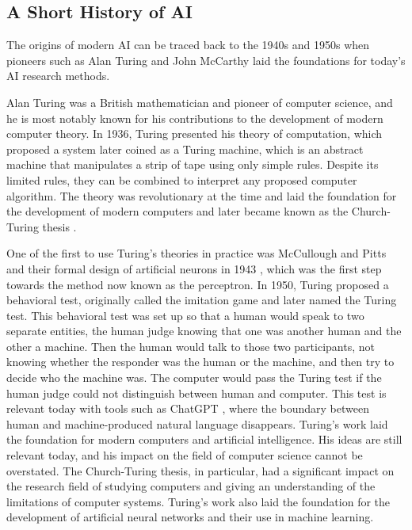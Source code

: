 \subsection{A Short History of AI}
The origins of modern AI can be traced back to the 1940s and 1950s when pioneers such as Alan Turing and John McCarthy laid the foundations for today's AI research methods. 

Alan Turing was a British mathematician and pioneer of computer science, and he is most notably known for his contributions to the development of modern computer theory. In 1936, Turing presented his theory of computation, which proposed a system later coined as a Turing machine, which is an abstract machine that manipulates a strip of tape using only simple rules. Despite its limited rules, they can be combined to interpret any proposed computer algorithm. The theory was revolutionary at the time and laid the foundation for the development of modern computers and later became known as the Church-Turing thesis \cite{turingSystemsLogicBased1938, churchUnsolvableProblemElementary1936}. 

One of the first to use Turing's theories in practice was McCullough and Pitts and their formal design of artificial neurons in 1943 \cite{mccullochLogicalCalculusIdeas1943, piccininiFirstComputationalTheory2020}, which was the first step towards the method now known as the perceptron. In 1950, Turing proposed a behavioral test, originally called the imitation game and later named the Turing test. This behavioral test was set up so that a human would speak to two separate entities, the human judge knowing that one was another human and the other a machine. Then the human would talk to those two participants, not knowing whether the responder was the human or the machine, and then try to decide who the machine was. The computer would pass the Turing test if the human judge could not distinguish between human and computer. This test is relevant today with tools such as ChatGPT \cite{ChatGPT}, where the boundary between human and machine-produced natural language disappears. Turing's work laid the foundation for modern computers and artificial intelligence. His ideas are still relevant today, and his impact on the field of computer science cannot be overstated. The Church-Turing thesis, in particular, had a significant impact on the research field of studying computers and giving an understanding of the limitations of computer systems. Turing's work also laid the foundation for the development of artificial neural networks and their use in machine learning.

